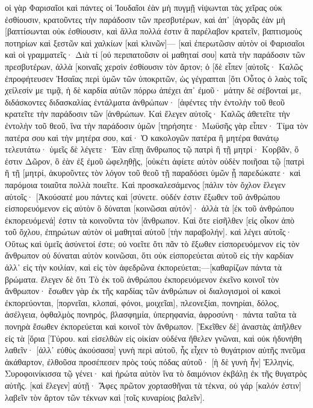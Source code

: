οἱ γὰρ Φαρισαῖοι καὶ πάντες οἱ Ἰουδαῖοι ἐὰν μὴ πυγμῇ νίψωνται τὰς χεῖρας οὐκ ἐσθίουσιν, κρατοῦντες τὴν παράδοσιν τῶν πρεσβυτέρων, 
καὶ ἀπ᾽ [ἀγορᾶς ἐὰν μὴ [βαπτίσωνται οὐκ ἐσθίουσιν, καὶ ἄλλα πολλά ἐστιν ἃ παρέλαβον κρατεῖν, βαπτισμοὺς ποτηρίων καὶ ξεστῶν καὶ χαλκίων [καὶ κλινῶν]— 
[καὶ ἐπερωτῶσιν αὐτὸν οἱ Φαρισαῖοι καὶ οἱ γραμματεῖς· Διὰ τί [οὐ περιπατοῦσιν οἱ μαθηταί σου] κατὰ τὴν παράδοσιν τῶν πρεσβυτέρων, ἀλλὰ [κοιναῖς χερσὶν ἐσθίουσιν τὸν ἄρτον; 
ὁ [δὲ εἶπεν [αὐτοῖς· Καλῶς ἐπροφήτευσεν Ἠσαΐας περὶ ὑμῶν τῶν ὑποκριτῶν, ὡς γέγραπται [ὅτι Οὗτος ὁ λαὸς τοῖς χείλεσίν με τιμᾷ, ἡ δὲ καρδία αὐτῶν πόρρω ἀπέχει ἀπ᾽ ἐμοῦ· 
μάτην δὲ σέβονταί με, διδάσκοντες διδασκαλίας ἐντάλματα ἀνθρώπων· 
[ἀφέντες τὴν ἐντολὴν τοῦ θεοῦ κρατεῖτε τὴν παράδοσιν τῶν [ἀνθρώπων. 
Καὶ ἔλεγεν αὐτοῖς· Καλῶς ἀθετεῖτε τὴν ἐντολὴν τοῦ θεοῦ, ἵνα τὴν παράδοσιν ὑμῶν [τηρήσητε· 
Μωϋσῆς γὰρ εἶπεν· Τίμα τὸν πατέρα σου καὶ τὴν μητέρα σου, καί· Ὁ κακολογῶν πατέρα ἢ μητέρα θανάτῳ τελευτάτω· 
ὑμεῖς δὲ λέγετε· Ἐὰν εἴπῃ ἄνθρωπος τῷ πατρὶ ἢ τῇ μητρί· Κορβᾶν, ὅ ἐστιν Δῶρον, ὃ ἐὰν ἐξ ἐμοῦ ὠφεληθῇς, 
[οὐκέτι ἀφίετε αὐτὸν οὐδὲν ποιῆσαι τῷ [πατρὶ ἢ τῇ [μητρί, 
ἀκυροῦντες τὸν λόγον τοῦ θεοῦ τῇ παραδόσει ὑμῶν ᾗ παρεδώκατε· καὶ παρόμοια τοιαῦτα πολλὰ ποιεῖτε. 
Καὶ προσκαλεσάμενος [πάλιν τὸν ὄχλον ἔλεγεν αὐτοῖς· [Ἀκούσατέ μου πάντες καὶ [σύνετε. 
οὐδέν ἐστιν ἔξωθεν τοῦ ἀνθρώπου εἰσπορευόμενον εἰς αὐτὸν ὃ δύναται [κοινῶσαι αὐτόν]· ἀλλὰ τὰ [ἐκ τοῦ ἀνθρώπου ἐκπορευόμενά] ἐστιν τὰ κοινοῦντα τὸν [ἄνθρωπον. 
Καὶ ὅτε εἰσῆλθεν [εἰς οἶκον ἀπὸ τοῦ ὄχλου, ἐπηρώτων αὐτὸν οἱ μαθηταὶ αὐτοῦ [τὴν παραβολήν]. 
καὶ λέγει αὐτοῖς· Οὕτως καὶ ὑμεῖς ἀσύνετοί ἐστε; οὐ νοεῖτε ὅτι πᾶν τὸ ἔξωθεν εἰσπορευόμενον εἰς τὸν ἄνθρωπον οὐ δύναται αὐτὸν κοινῶσαι, 
ὅτι οὐκ εἰσπορεύεται αὐτοῦ εἰς τὴν καρδίαν ἀλλ᾽ εἰς τὴν κοιλίαν, καὶ εἰς τὸν ἀφεδρῶνα ἐκπορεύεται;—[καθαρίζων πάντα τὰ βρώματα. 
ἔλεγεν δὲ ὅτι Τὸ ἐκ τοῦ ἀνθρώπου ἐκπορευόμενον ἐκεῖνο κοινοῖ τὸν ἄνθρωπον· 
ἔσωθεν γὰρ ἐκ τῆς καρδίας τῶν ἀνθρώπων οἱ διαλογισμοὶ οἱ κακοὶ ἐκπορεύονται, [πορνεῖαι, κλοπαί, φόνοι, 
μοιχεῖαι], πλεονεξίαι, πονηρίαι, δόλος, ἀσέλγεια, ὀφθαλμὸς πονηρός, βλασφημία, ὑπερηφανία, ἀφροσύνη· 
πάντα ταῦτα τὰ πονηρὰ ἔσωθεν ἐκπορεύεται καὶ κοινοῖ τὸν ἄνθρωπον. 
[Ἐκεῖθεν δὲ] ἀναστὰς ἀπῆλθεν εἰς τὰ [ὅρια [Τύρου. καὶ εἰσελθὼν εἰς οἰκίαν οὐδένα ἤθελεν γνῶναι, καὶ οὐκ ἠδυνήθη λαθεῖν· 
[ἀλλ᾽ εὐθὺς ἀκούσασα] γυνὴ περὶ αὐτοῦ, ἧς εἶχεν τὸ θυγάτριον αὐτῆς πνεῦμα ἀκάθαρτον, ἐλθοῦσα προσέπεσεν πρὸς τοὺς πόδας αὐτοῦ· 
[ἡ δὲ γυνὴ ἦν] Ἑλληνίς, Συροφοινίκισσα τῷ γένει· καὶ ἠρώτα αὐτὸν ἵνα τὸ δαιμόνιον ἐκβάλῃ ἐκ τῆς θυγατρὸς αὐτῆς. 
[καὶ ἔλεγεν] αὐτῇ· Ἄφες πρῶτον χορτασθῆναι τὰ τέκνα, οὐ γάρ [καλόν ἐστιν] λαβεῖν τὸν ἄρτον τῶν τέκνων καὶ [τοῖς κυναρίοις βαλεῖν]. 
